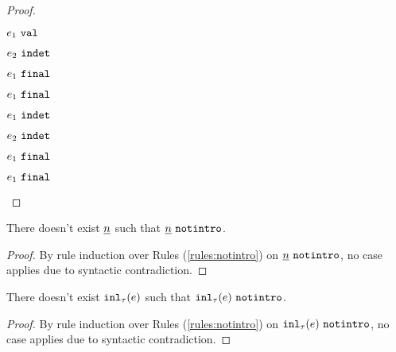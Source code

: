 \begin{proof}
\begin{byCases}
\begin{byCases}
\begin{pfsteps*}
        \end{pfsteps*}
    \item[\text{(\ref{rule:IPairR})}]
        \begin{pfsteps*}
        \item $e_1 ~\mathtt{val}$  
        \item $e_2 ~\mathtt{indet}$  
        \item $e_1 ~\mathtt{final}$ 
        \item $e_1 ~\mathtt{final}$ 
        \end{pfsteps*}
    \item[\text{(\ref{rule:IPair})}]
        \begin{pfsteps*}
        \item $e_1 ~\mathtt{indet}$  
        \item $e_2 ~\mathtt{indet}$  
        \item $e_1 ~\mathtt{final}$ 
        \item $e_1 ~\mathtt{final}$ 
        \end{pfsteps*}
    \end{byCases}
\end{byCases}
\resetpfcounter
\end{proof}

\begin{lemma}
  \label{lem:no-num-notintro}
  There doesn't exist $\underline{n}$ such that $\underline{n} ~\mathtt{notintro}$.
\end{lemma}
\begin{proof}
    By rule induction over Rules (\ref{rules:notintro}) on $\underline{n} ~\mathtt{notintro}$, no case applies due to syntactic contradiction.
\end{proof}

\begin{lemma}
  \label{lem:no-inl-notintro}
  There doesn't exist $\mathtt{inl}_{\tau}({e})$ such that $\mathtt{inl}_{\tau}({e}) ~\mathtt{notintro}$.
\end{lemma}
\begin{proof}
    By rule induction over Rules (\ref{rules:notintro}) on $\mathtt{inl}_{\tau}({e}) ~\mathtt{notintro}$, no case applies due to syntactic contradiction.
\end{proof}

